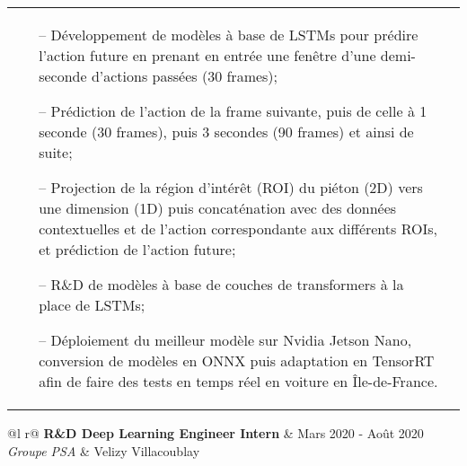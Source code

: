 \documentclass[a4paper,12pt]{article}
\begin{document}
\begin{tabularx}{\linewidth}{ @{}l r@{} }
{\begin{minipage}[t]{\linewidth}
\begin{itemize}[nosep,after=\strut, leftmargin=1em, itemsep=3pt]
        \item[--] Développement de modèles à base de LSTMs pour prédire l’action future en prenant en entrée une fenêtre d’une demi-seconde d’actions passées (30 frames);
        \item[--] Prédiction de l’action de la frame suivante, puis de celle à 1 seconde (30 frames), puis 3 secondes (90 frames) et ainsi de suite;
        \item[--] Projection de la région d’intérêt (ROI) du piéton (2D) vers une dimension (1D) puis concaténation avec des données contextuelles et de l’action correspondante aux différents ROIs, et prédiction de l’action future;
        \item[--] R\&D de modèles à base de couches de transformers à la place de LSTMs;
        \item[--] Déploiement du meilleur modèle sur Nvidia Jetson Nano, conversion de modèles en ONNX puis adaptation en TensorRT afin de faire des tests en temps réel en voiture en Île-de-France.
    \end{itemize}
    \end{minipage}
}
\end{tabularx}


\begin{tabularx}{\linewidth}{ @{}l r@{} }
\textbf{R\&D Deep Learning Engineer Intern} & \hfill Mars 2020 - Août 2020 \\
\textit{Groupe PSA} & \hfill Velizy Villacoublay \\[3.75pt]
\end{tabularx}
\end{document}
